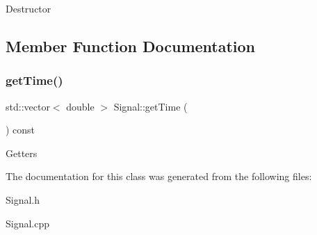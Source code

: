 Destructor 

\subsection{Member Function Documentation}
\mbox{\label{class_signal_a9e55e5bdd1606e4e21edfd19e31a83df}} 
\subsubsection{\texorpdfstring{get\+Time()}{getTime()}}
{\footnotesize\ttfamily std\+::vector$<$ double $>$ Signal\+::get\+Time (\begin{DoxyParamCaption}{ }\end{DoxyParamCaption}) const}

Getters 

The documentation for this class was generated from the following files\+:\begin{DoxyCompactItemize}
\item 
Signal.\+h\item 
Signal.\+cpp\end{DoxyCompactItemize}
